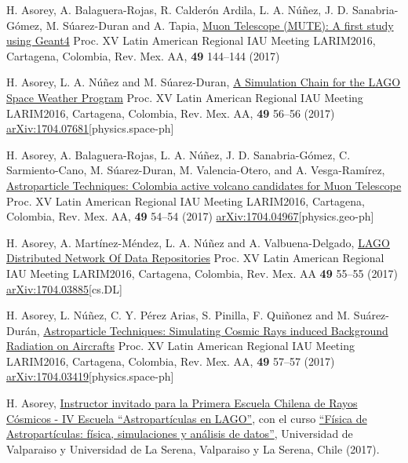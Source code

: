 \begin{etaremune}
\item {} H. Asorey, A. Balaguera-Rojas, R. Calderón Ardila, L. A. Núñez, J. D. Sanabria-Gómez, M. Súarez-Duran and A. Tapia, \href{http://www.astroscu.unam.mx/rmaa/RMxAC..49/PDF/RMxAC..49\_poster2.pdf}{{Muon Telescope (MUTE): A first study using Geant4}} \en Proc.
XV Latin American Regional IAU Meeting LARIM2016, Cartagena, Colombia, Rev.
Mex.
AA, {\textbf{49}} 144--144 (2017)

\item {} H. Asorey, L. A. Núñez and M. Súarez-Duran, \href{http://www.astroscu.unam.mx/rmaa/RMxAC..49/PDF/RMxAC..49\_oral6.pdf}{{A Simulation Chain for the LAGO Space Weather Program}} \en Proc.
XV Latin American Regional IAU Meeting LARIM2016, Cartagena, Colombia, Rev.
Mex.
AA, {\textbf{49}} 56--56 (2017) \href{http://arxiv.org/abs/1704.07681}{arXiv:1704.07681}[physics.space-ph]

\item {} H. Asorey, A. Balaguera-Rojas, L. A. Núñez, J. D. Sanabria-Gómez, C. Sarmiento-Cano, M. Súarez-Duran, M. Valencia-Otero, and A. Vesga-Ramírez, \href{http://www.astroscu.unam.mx/rmaa/RMxAC..49/PDF/RMxAC..49\_oral4.pdf}{{Astroparticle Techniques: Colombia active volcano candidates for Muon Telescope}} \en Proc.
XV Latin American Regional IAU Meeting LARIM2016, Cartagena, Colombia, Rev.
Mex.
AA, {\textbf{49}} 54--54 (2017) \href{http://arxiv.org/abs/1704.04967}{arXiv:1704.04967}[physics.geo-ph]

\item {}H. Asorey, A. Martínez-Méndez, L. A. Núñez and A. Valbuena-Delgado, \href{http://www.astroscu.unam.mx/rmaa/RMxAC..49/PDF/RMxAC..49\_oral5.pdf}{{LAGO Distributed Network Of Data Repositories}} \en Proc.
XV Latin American Regional IAU Meeting LARIM2016, Cartagena, Colombia, Rev.
Mex.
AA {\textbf{49}} 55--55 (2017) \href{http://arxiv.org/abs/1704.03885}{arXiv:1704.03885}[cs.DL]

\item {}H. Asorey, L. Núñez, C. Y. Pérez Arias, S. Pinilla, F. Quiñonez and M. Suárez-Durán, \href{http://www.astroscu.unam.mx/rmaa/RMxAC..49/PDF/RMxAC..49\_oral7.pdf}{{Astroparticle Techniques: Simulating Cosmic Rays induced Background Radiation on Aircrafts}} \en Proc.
XV Latin American Regional IAU Meeting LARIM2016, Cartagena, Colombia, Rev.
Mex.
AA, {\textbf{49}} 57--57 (2017) \href{http://arxiv.org/abs/1704.03419}{arXiv:1704.03419}[physics.space-ph]

\item {} H. Asorey, \href{http://ifa.uv.cl/rayoscosmicos/}{{Instructor invitado para la Primera Escuela Chilena de Rayos Cósmicos - IV Escuela ``Astropartículas en LAGO''}}, con el curso \href{https://github.com/lagoproject/astroparticulas}{{``Física de Astropartículas: física, simulaciones y análisis de datos''}}, Universidad de Valparaiso y Universidad de La Serena, Valparaiso y La Serena, Chile (2017).


\end{etaremune}
